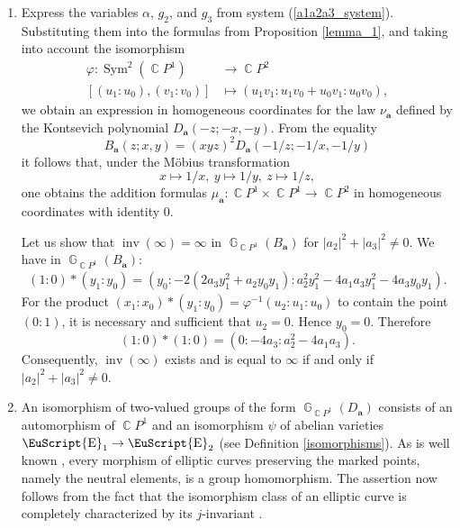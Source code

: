 \documentclass[14pt, dvipsnames]{extarticle}
\makeatletter
\theoremstyle{plain}
\theoremstyle{definition}
\theoremstyle{remark}
\renewenvironment{proof}[1][\proofname]{
  \par\pushQED{\qed}\normalfont
  \topsep6\p@\@plus6\p@\relax
  \trivlist\item[\hskip\labelsep\bfseries\itshape #1\@addpunct{.}]
}{\popQED\endtrivlist\@endpefalse}
\let\phi\varphi
\DeclareMathOperator{\E}{\EuScript{E}}
\DeclareMathOperator{\G}{\mathbb{G}}
\DeclareMathOperator{\Sym}{\mathrm{Sym}}
\DeclareMathOperator{\inv}{\mathrm{inv}}
\DeclareMathOperator{\Cc}{\mathbb{C}}
\makeatother
\begin{document}
\begin{proof}
\begin{enumerate}[\bf (i)]
\item Express the variables $\alpha$, $g_2$, and $g_3$ from system (\ref{a1a2a3_system}). Substituting them into the formulas from Proposition \ref{lemma_1}, and taking into account the isomorphism
$$\begin{aligned}
\phi: \Sym^2(\Cc\!P^1) &\to \Cc\!P^2\\
[(u_1:u_0), (v_1:v_0)] &\mapsto (u_1v_1:u_1v_0+u_0v_1:u_0v_0),
\end{aligned}$$
we obtain an expression in homogeneous coordinates for the law $\nu_{\boldsymbol{a}}$ defined by the Kontsevich polynomial $D_{\boldsymbol{a}}(-z; -x, -y)$. From the equality
$$B_{\boldsymbol{a}}(z; x, y) = (xyz)^2D_{\boldsymbol{a}}(-1/z; -1/x, -1/y)$$
it follows that, under the Möbius transformation
$$x\mapsto 1/x,\ y\mapsto 1/y,\ z\mapsto 1/z,$$
one obtains the addition formulas $\mu_{\boldsymbol{a}}: \Cc\!P^1\times\Cc\!P^1\to \Cc\!P^2$ in homogeneous coordinates with identity $0$.

Let us show that $\inv(\infty) = \infty$ in $\G_{\Cc\!P^1}(B_{\boldsymbol a})$ for $|a_2|^2 + |a_3|^2\neq 0$. We have in $\G_{\Cc\!P^1}(B_{\boldsymbol a})$:
$$\begin{aligned}
(1:0)\ast(y_1:y_0) = (y_0: -2 (2 a_3 y_1^2+a_2 y_0 y_1):a_2^2 y_1^2-4 a_1 a_3 y_1^2-4 a_3 y_0 y_1).
\end{aligned}$$
For the product $(x_1:x_0)\ast(y_1:y_0) = \phi^{-1}(u_2:u_1:u_0)$ to contain the point $(0:1)$, it is necessary and sufficient that $u_2 = 0$. Hence $y_0 = 0$. Therefore
$$(1:0)\ast(1:0) = (0:-4a_3:a_2^2-4 a_1 a_3).$$
Consequently, $\inv(\infty)$ exists and is equal to $\infty$ if and only if $|a_2|^2 + |a_3|^2\neq 0$.


\item An isomorphism of two-valued groups of the form $\G_{\Cc\!P^1}(D_{\boldsymbol{a}})$ consists of an automorphism of $\Cc\!P^1$ and an isomorphism $\psi$ of abelian varieties $\E_1\to\E_2$ (see Definition \ref{isomorphisms}). As is well known \cite[Lemma 4.9]{Hartshorne}, every morphism of elliptic curves preserving the marked points, namely the neutral elements, is a group homomorphism. The assertion now follows from the fact that the isomorphism class of an elliptic curve is completely characterized by its $j$-invariant \cite[Theorem 4.1]{Hartshorne}.   
\end{enumerate}
\end{proof}
\end{document}
